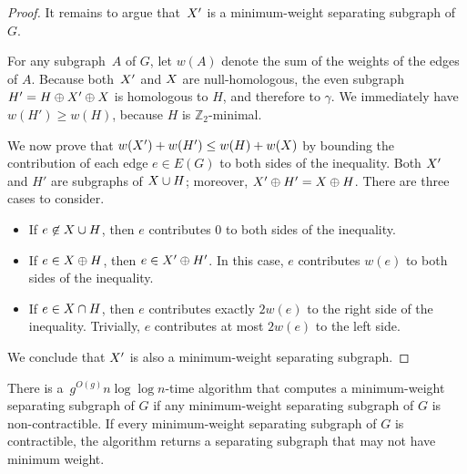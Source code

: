 \documentclass[letterpaper,review]{siamart190516}
\def\Z{\mathbb{Z}}
\begin{document}
{\begin{proof}
It remains to argue that~$X'$ is a minimum-weight separating subgraph of $G$.

For any subgraph~$A$ of $G$, let $w(A)$ denote the sum of the weights of the edges of $A$. Because both~$X'$ and $X$ are null-homologous, the even subgraph $H' = H \oplus X' \oplus X$ is homologous to $H$, and therefore to $\gamma$.  We immediately have $w(H') \ge w(H)$, because $H$ is $\Z_2$-minimal.

  We now prove that $w(X') + w(H') \leq w(H) + w(X)$ by bounding the contribution of each edge $e \in E(G)$ to both sides of the inequality.  Both $X'$ and $H'$ are subgraphs of $X\cup H$; moreover, $X' \oplus H' = X \oplus H$.  There are three cases to consider.
\begin{itemize}
\item
If $e \not\in X\cup H$, then $e$ contributes $0$ to both sides of the inequality.
\item
If $e \in X \oplus H$, then $e \in X' \oplus H'$.  In this case, $e$ contributes $w(e)$ to both sides of the inequality.
\item
If $e \in X \cap H$, then $e$ contributes exactly $2w(e)$ to the right side of the inequality.  Trivially, $e$ contributes at most $2w(e)$ to the left side.
\end{itemize}
We conclude that $X'$ is also a minimum-weight separating subgraph.
\end{proof}

\begin{lemma}
\label{lem:global_split-alg}
There is a~$g^{O(g)} n \log \log n$-time algorithm that computes a minimum-weight separating subgraph of $G$ if any minimum-weight separating subgraph of $G$ is non-contractible.  If every minimum-weight separating subgraph of $G$ is contractible, the algorithm returns a separating subgraph that may not have minimum weight.
\end{lemma}

}
\end{document}
